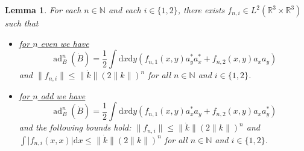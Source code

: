 \documentclass[11pt,a4paper]{scrartcl}
\newtheorem{lem}[thm]{Lemma}
\newcommand{\ad}{\operatorname{ad}}	%
\newcommand{\di}{\textrm{d}}		%
\newcommand{\Rbb}{\mathbb{R}}		%
\newcommand{\Nbb}{\mathbb{N}}		%
\newcommand{\norm}[1]{\lVert#1\rVert}	%
\newcommand{\bd}{\begin{displaymath}}			%
\newcommand{\ed}{\end{displaymath}}
\begin{document}
\begin{lem}
\label{lm:highercommutators}
 For each $n \in \Nbb$ and each $i \in \{1,2\}$, there exists $f_{n,i} \in L^2(\Rbb^3 \times \Rbb^3)$ such that
\begin{itemize}
 \item \underline{for $n$ even we have}
\bd
\ad^n_B(\dot B) = \frac{1}{2} \int \di x\di y\left( f_{n,1}(x,y) a^\ast_y a^\ast_x + f_{n,2}(x,y) a_x a_y \right)
\ed
and $\norm{f_{n,i}} \leq \norm{\dot k} (2\norm{k})^n$ for all $n \in \Nbb$ and $i \in \{1,2\}$. 
 \item \underline{for $n$ odd we have}
\bd
\ad^n_B(\dot B) = \frac{1}{2} \int \di x\di y\left( f_{n,1}(x,y) a^\ast_x a_y + f_{n,2}(x,y) a_x a^\ast_y \right)
\ed
and the following bounds hold: $\norm{f_{n,i}} \leq \norm{\dot k} (2\norm{k})^n$ and $\int \lvert f_{n,i}(x,x)\rvert \di x \leq \norm{\dot k} (2\norm{k})^n$ for all $n \in \Nbb$ and $i \in \{1,2\}$. 
\end{itemize}
\end{lem}
\end{document}
